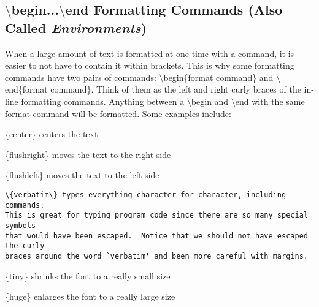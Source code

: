 \documentclass[10pt]{article}
\begin{document}
\subsection{$ \setminus $begin...$ \setminus $end Formatting Commands (Also Called \textit{Environments})\label{envFormattingCmds}}
When a large amount of text is formatted at one time with a command, it is easier to not have to contain it within brackets.  This is why some formatting commands have two pairs of commands: $ \setminus $begin\{format command\} and $ \setminus $end\{format command\}.  Think of them as the left and right curly braces of the in-line formatting commands.  Anything between a $ \setminus $begin and $ \setminus $end with the same format command will be formatted.  Some examples include:
\begin{center}
\{center\} centers the text
\end{center}
\begin{flushright}
\{flushright\} moves the text to the right side
\end{flushright}
\begin{flushleft}
\{flushleft\} moves the text to the left side
\end{flushleft}
\begin{verbatim}
\{verbatim\} types everything character for character, including commands.  
This is great for typing program code since there are so many special symbols 
that would have been escaped.  Notice that we should not have escaped the curly 
braces around the word `verbatim' and been more careful with margins.
\end{verbatim}
\begin{tiny}
\{tiny\} shrinks the font to a really small size
\end{tiny}
\begin{huge}
\{huge\} enlarges the font to a really large size
\end{huge}
\end{document}
